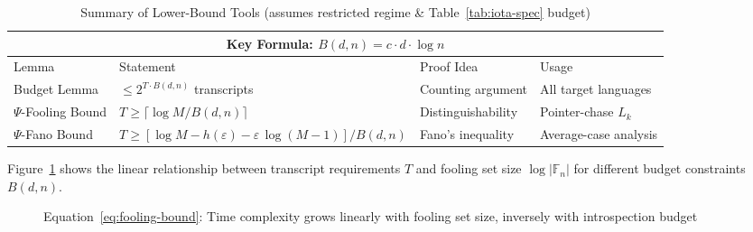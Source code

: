 \begin{table}[htbp]
\centering
\caption{Summary of Lower-Bound Tools (assumes restricted regime \& Table~\ref{tab:iota-spec} budget)}
\label{tab:lower-bound-summary}
\small
\begin{tabular}{@{}p{2.5cm}p{5.5cm}p{3cm}p{3.5cm}@{}}
\toprule
\multicolumn{4}{c}{\textbf{Key Formula: } $B(d,n) = c \cdot d \cdot \log n$} \\
\midrule
Lemma & Statement & Proof Idea & Usage \\
\midrule
Budget Lemma & $\leq 2^{T \cdot B(d,n)}$ transcripts & Counting argument & All target languages \\
$\Psi$-Fooling Bound & $T \geq \lceil \log M / B(d,n) \rceil$ & Distinguishability & Pointer-chase $L_k$ \\
$\Psi$-Fano Bound & $T \geq [\log M - h(\varepsilon) - \varepsilon \, \log(M-1)] / B(d,n)$ & Fano's inequality & Average-case analysis \\
\bottomrule
\end{tabular}
\end{table}

\begin{remark}[Visualization]
Figure~\ref{fig:bounds-visualization} shows the linear relationship between transcript requirements $T$ and fooling set size $\log|\mathbb{F}_n|$ for different budget constraints $B(d,n)$.
\end{remark}

\begin{figure}[htbp]
\centering
{}
\caption{Equation~\eqref{eq:fooling-bound}: Time complexity grows linearly with fooling set size, inversely with introspection budget}
\label{fig:bounds-visualization}
\end{figure}

